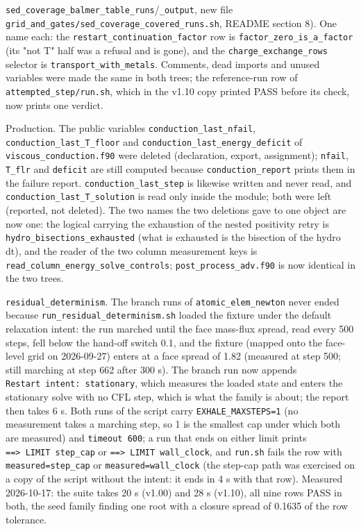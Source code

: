 \documentclass[english,a4paper]{my_memo}
\begin{document}
\texttt{sed\_coverage\_balmer\_table\_runs}/\texttt{\_output}, new file \texttt{grid\_and\_gates/sed\_coverage\_covered\_runs.sh}, README section 8). One name each: the \texttt{restart\_continuation\_factor} row is \texttt{factor\_zero\_is\_a\_factor} (its "not T" half was a refusal and is gone), and the \texttt{charge\_exchange\_rows} selector is \texttt{transport\_with\_metals}. Comments, dead imports and unused variables were made the same in both trees; the reference-run row of \texttt{attempted\_step/run.sh}, which in the v1.10 copy printed PASS before its check, now prints one verdict.

Production. The public variables \texttt{conduction\_last\_nfail}, \texttt{conduction\_last\_T\_floor} and \texttt{conduction\_last\_energy\_deficit} of \texttt{viscous\_conduction.f90} were deleted (declaration, export, assignment); \texttt{nfail}, \texttt{T\_flr} and \texttt{deficit} are still computed because \texttt{conduction\_report} prints them in the failure report. \texttt{conduction\_last\_step} is likewise written and never read, and \texttt{conduction\_last\_T\_solution} is read only inside the module; both were left (reported, not deleted). The two names the two deletions gave to one object are now one: the logical carrying the exhaustion of the nested positivity retry is \texttt{hydro\_bisections\_exhausted} (what is exhausted is the bisection of the hydro dt), and the reader of the two column measurement keys is \texttt{read\_column\_energy\_solve\_controls}; \texttt{post\_process\_adv.f90} is now identical in the two trees.

\texttt{residual\_determinism}. The branch runs of \texttt{atomic\_elem\_newton} never ended because \texttt{run\_residual\_determinism.sh} loaded the fixture under the default relaxation intent: the run marched until the face mass-flux spread, read every 500 steps, fell below the hand-off switch 0.1, and the fixture (mapped onto the face-level grid on 2026-09-27) enters at a face spread of 1.82 (measured at step 500; still marching at step 662 after 300 s). The branch run now appends \texttt{Restart\ intent:\ stationary}, which measures the loaded state and enters the stationary solve with no CFL step, which is what the family is about; the report then takes 6 s. Both runs of the script carry \texttt{EXHALE\_MAXSTEPS=1} (no measurement takes a marching step, so 1 is the smallest cap under which both are measured) and \texttt{timeout\ 600}; a run that ends on either limit prints \texttt{==\textgreater{}\ LIMIT\ step\_cap} or \texttt{==\textgreater{}\ LIMIT\ wall\_clock}, and \texttt{run.sh} fails the row with \texttt{measured=step\_cap} or \texttt{measured=wall\_clock} (the step-cap path was exercised on a copy of the script without the intent: it ends in 4 s with that row). Measured 2026-10-17: the suite takes 20 s (v1.00) and 28 s (v1.10), all nine rows PASS in both, the seed family finding one root with a closure spread of 0.1635 of the row tolerance.
\end{document}
